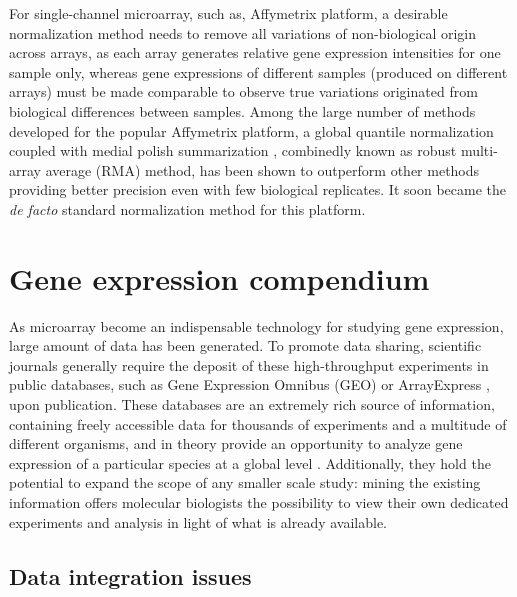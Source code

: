 For single-channel microarray, such as, Affymetrix platform, a desirable normalization method needs to remove all variations of non-biological origin across arrays, as each array generates relative gene expression intensities for one sample only, whereas gene expressions of different samples (produced on different arrays) must be made comparable to observe true variations originated from biological differences between samples. Among the large number of methods developed for the popular Affymetrix platform, a global quantile normalization \cite{Bolstad2003,Irizarry2003a} coupled with medial polish summarization \cite{Irizarry2003}, combinedly known as robust multi-array average (RMA) method, has been shown to outperform other methods \cite{Irizarry2006} providing better precision even with few biological replicates.  It soon became the \textit{de facto} standard normalization method for this platform.









\section{Gene expression compendium}


As microarray become an indispensable technology for studying gene expression, large amount of data has been generated. To promote data sharing, scientific journals generally require the deposit of these high-throughput experiments in public databases, such as Gene Expression Omnibus (GEO) \cite{Barrett2011} or ArrayExpress \cite{Parkinson2009}, upon publication. These databases are an extremely rich source of information, containing freely accessible data for thousands of experiments and a multitude of different organisms, and in theory provide an opportunity to analyze gene expression of a particular species at a global level \cite{Ideker2001}. Additionally, they hold the potential to expand the scope of any smaller scale study: mining the existing information offers molecular biologists the possibility to view their own dedicated experiments and analysis in light of what is already available.






\subsection{Data integration issues}

